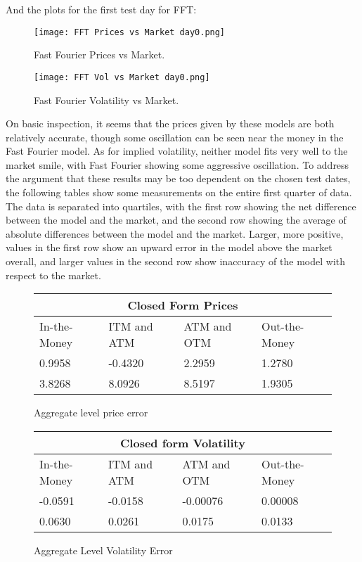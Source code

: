 \documentclass[fontsize=12pt]{article}
\numberwithin{equation}{section} %
\numberwithin{figure}{section} %
\numberwithin{table}{section} %
\begin{document}
And the plots for the first test day for FFT:

\begin{figure}[H]
  \centering
   \texttt{[image: FFT Prices vs Market day0.png]}
  \caption{Fast Fourier Prices vs Market.}
  \label{fig:CF Prices}
\end{figure}

\begin{figure}[H]
  \centering
   \texttt{[image: FFT Vol vs Market day0.png]}
  \caption{Fast Fourier Volatility vs Market.}
  \label{fig:CF Prices}
\end{figure}


On basic inspection, it seems that the prices given by these models are both relatively accurate, though some oscillation can be seen near the money in the Fast Fourier model. As for implied volatility, neither model fits very well to the market smile, with Fast Fourier showing some aggressive oscillation. To address the argument that these results may be too dependent on the chosen test dates, the following tables show some measurements on the entire first quarter of data. The data is separated into quartiles, with the first row showing the net difference between the model and the market, and the second row showing the average of absolute differences between the model and the market. Larger, more positive, values in the first row show an upward error in the model above the market overall, and larger values in the second row show inaccuracy of the model with respect to the market.

\begin{figure}[H]
\centering
\begin{tabular}{| p{2.5cm} | p{2.5cm} | p{2.5cm} | p{2.5cm}|}
\hline
\multicolumn{4}{|c|}{Closed Form Prices} \\
\hline
 In-the-Money & ITM and ATM & ATM and OTM & Out-the-Money \\ \hline
0.9958 & -0.4320 & 2.2959 & 1.2780 \\ \hline
3.8268 & 8.0926  & 8.5197 & 1.9305 \\ \hline
\end{tabular}
\caption{Aggregate level price error}
\label{tabla:Aggregate price error CF}
\end{figure}

\begin{figure}[H]
\centering
\begin{tabular}{| p{2.5cm} | p{2.5cm} | p{2.5cm} | p{2.5cm}|}
\hline
\multicolumn{4}{|c|}{Closed form Volatility} \\
\hline
 In-the-Money & ITM and ATM & ATM and OTM & Out-the-Money \\ \hline
-0.0591 & -0.0158 & -0.00076 &  0.00008 \\ \hline
0.0630 & 0.0261 & 0.0175 & 0.0133 \\ \hline
\end{tabular}
\caption{Aggregate Level Volatility Error}
\label{tabla:Aggregate Vol Error CF}
\end{figure}
\end{document}
